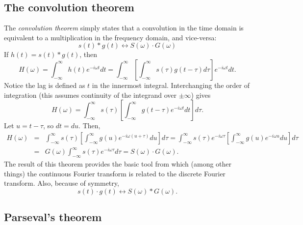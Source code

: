 \subsection{The convolution theorem}
\label{sec:convolutiontheorem}
	The \emph{convolution theorem} simply states that a convolution in the time domain is equivalent to
a multiplication in the frequency domain, and vice-versa:
\begin{equation}
s(t) * g(t) \leftrightarrow S (\omega) \cdot G (\omega)
\end{equation}
If $h(t) = s(t) * g(t)$, then
$$
H (\omega) = \int^\infty_{-\infty} h(t) e^{-i \omega t} dt = \int^\infty_{-\infty} \left [ \int^\infty_{-\infty} s(\tau) g (t- \tau) d\tau \right ]
e^{-i \omega t} dt.
$$
Notice the lag is defined as $t$ in the innermost integral. Interchanging the order of integration (this assumes
continuity of the integrand over $\pm\infty$) gives
$$
H (\omega) = \int^\infty_{-\infty} s(\tau) \left[ \int^\infty_{-\infty} g( t - \tau) e^{-i \omega t} dt \right ] d\tau.
$$
Let $u = t - \tau$, so $dt = du$. Then,
$$
\begin{array}{rcl}
H (\omega) & = & \displaystyle \int^\infty_{-\infty} s(\tau) \left[ \int^\infty_{-\infty} g(u)
e^{-i \omega(u + \tau)} du \right ] d\tau = \int^\infty_{-\infty} s(\tau) e^{-i \omega \tau}
\left[ \int^\infty_{-\infty} g(u) e^{-i \omega u} du \right ] d\tau \\[10pt]
& = & \displaystyle G (\omega) \int^\infty_{-\infty} s(\tau) e^{-i \omega \tau} d\tau = S(\omega) \cdot G (\omega).
\end{array}
$$
The result of this theorem provides the basic tool from which (among other things) the
continuous Fourier transform is related to the discrete Fourier transform. Also, because
of symmetry,
\begin{equation}
s(t) \cdot g (t) \leftrightarrow S (\omega) * G (\omega).
\end{equation}

\subsection{Parseval's theorem}
\label{sec:Parseval}

